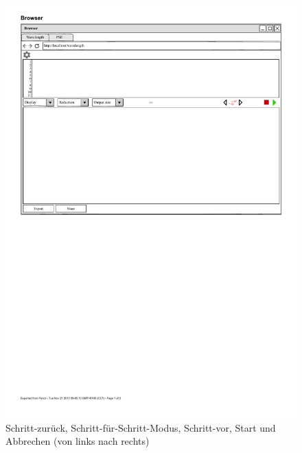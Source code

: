\documentclass[parskip=full,11pt,twoside]{scrartcl}
\begin{document}
{\begin{figure}[H]
	\centering
	\includegraphics{img/actionButton}
	\caption{\label{fig:actionButtons} Schritt-zurück, Schritt-für-Schritt-Modus, 
	Schritt-vor, Start und Abbrechen (von links nach rechts)}
\end{figure}



}
\end{document}
